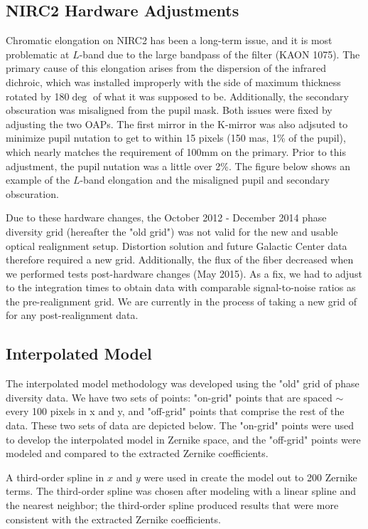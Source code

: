 \subsection{NIRC2 Hardware Adjustments}
Chromatic elongation on NIRC2 has been a long-term issue, and it is most problematic at $L$-band due to the large bandpass of the filter (KAON 1075). The primary cause of this elongation arises from the dispersion of the infrared dichroic, which was installed improperly with the side of maximum thickness rotated by 180$\deg$ of what it was supposed to be. Additionally, the secondary obscuration was misaligned from the pupil mask. Both issues were fixed by adjusting the two OAPs. The first mirror in the K-mirror was also adjsuted to minimize pupil nutation to get to within 15 pixels (150 mas, 1\% of the pupil), which nearly matches the requirement of 100mm on the primary. Prior to this adjustment, the pupil nutation was a little over 2\%. The figure below shows an example of the $L$-band elongation and the misaligned pupil and secondary obscuration.

Due to these hardware changes, the October 2012 - December 2014 phase diversity grid (hereafter the "old grid") was not valid for the new and usable optical realignment setup. Distortion solution and future Galactic Center data therefore required a new grid. Additionally, the flux of the fiber decreased when we performed tests post-hardware changes (May 2015). As a fix, we had to adjust to the integration times to obtain data with comparable signal-to-noise ratios as the pre-realignment grid. We are currently in the process of taking a new grid of for any post-realignment data.
\subsection{Interpolated Model}
The interpolated model methodology was developed using the "old" grid of phase diversity data. We have two sets of points: "on-grid" points that are spaced $\sim$every 100 pixels in x and y, and "off-grid" points that comprise the rest of the data. These two sets of data are depicted below. The "on-grid" points were used to develop the interpolated model in Zernike space, and the "off-grid" points were modeled and compared to the extracted Zernike coefficients.

A third-order spline in $x$ and $y$ were used in create the model out to 200 Zernike terms. The third-order spline was chosen after modeling with a linear spline and the nearest neighbor; the third-order spline produced results that were more consistent with the extracted Zernike coefficients. 

